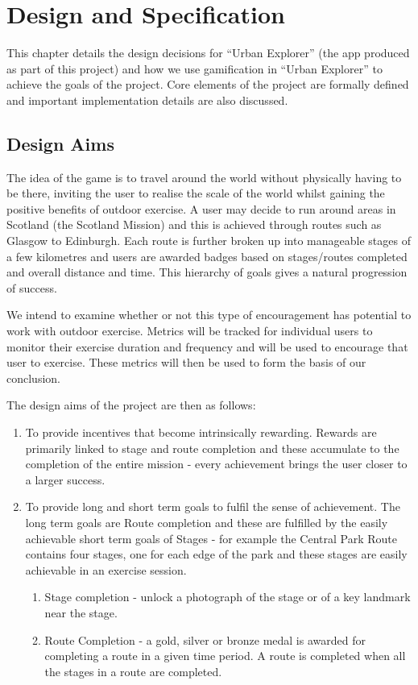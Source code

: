 \chapter{Design and Specification}\label{ch_method}

This chapter details the design decisions for ``Urban Explorer'' (the
app produced as part of this project) and how we use gamification in
``Urban Explorer'' to achieve the goals of the project. Core elements
of the project are formally defined and important implementation
details are also discussed.

\section{Design Aims}

The idea of the game is to travel around the world without physically
having to be there, inviting the user to realise the scale of the
world whilst gaining the positive benefits of outdoor exercise. A user
may decide to run around areas in Scotland (the Scotland Mission) and
this is achieved through routes such as Glasgow to Edinburgh. Each
route is further broken up into manageable stages of a few kilometres
and users are awarded badges based on stages/routes completed and
overall distance and time. This hierarchy of goals gives a natural
progression of success.

We intend to examine whether or not this type of encouragement
has potential to work with outdoor exercise. Metrics will be tracked
for individual users to monitor their exercise duration and frequency
and will be used to encourage that user to exercise. These metrics will
then be used to form the basis of our conclusion.

The design aims of the project are then as follows:
\begin{enumerate}
  \item To provide incentives that become intrinsically
    rewarding. Rewards are primarily linked to stage and route 
    completion and these accumulate to the completion of the entire
    mission - every achievement brings the user closer to a larger
    success. 
  \item To provide long and short term goals to fulfil the sense of
    achievement. The long term goals are Route completion and these are
    fulfilled by the easily achievable short term goals of Stages -
    for example the Central Park Route contains four stages, one for
    each edge of the park and these stages are easily achievable in an
    exercise session.
    \begin{enumerate}
      \item Stage completion - unlock a photograph of the stage or of
        a key landmark near the stage. 
      \item Route Completion - a gold, silver or bronze medal is
        awarded for completing a route in a given time period. A route
        is completed when all the stages in a route are completed.
    \end{enumerate}
\end{enumerate}

